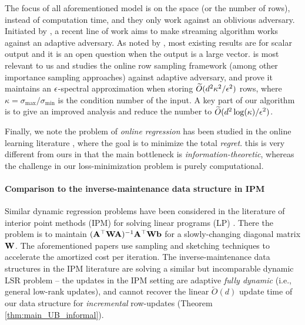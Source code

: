 The focus of all aforementioned model is on the space (or the number of rows), instead of computation time, and they only work against an oblivious adversary.
Initiated by \cite{bjwy22}, a recent line of work \cite{bjwy22, hkm+22,wz22} aims to make streaming algorithm works against an adaptive adversary. 
As noted by \cite{workshop2021}, most existing results are for scalar output and it is an open question when the output is a large vector.
\cite{bhm+21} is most relevant to us and studies the online row sampling framework \cite{cmp20} (among other importance sampling approaches) against adaptive adversary, and prove it maintains an $\epsilon$-spectral approximation when storing $\widetilde{O}(d^2\kappa^2/\epsilon^2)$ rows, where $\kappa = \sigma_{\max}/\sigma_{\min}$ is the condition number of the input. 
A key part of our algorithm is to give an improved analysis and reduce the number to $\widetilde{O}(d^2\log (\kappa)/\epsilon^2)$.

Finally, we note the problem of {\em online regression} has been studied in the online learning literature \cite{h19}, where the goal is to minimize the total {\em regret}. this is very different from ours in that the main bottleneck  is {\em information-theoretic}, whereas the challenge in our loss-minimization problem is purely computational.




\paragraph{Comparison to the inverse-maintenance data structure in IPM} Similar dynamic regression problems have been considered in the literature of interior point methods (IPM) for solving linear programs (LP) \cite{cls21,b20,lsz19,jswz21,ls14,blss20,bll+21}. There the problem is to maintain $(\mathbf{A}^\top \mathbf{W} \mathbf{A})^{-1} \mathbf{A}^\top \mathbf{W} \mathbf{b}$ for a slowly-changing diagonal matrix $\mathbf{W}$. The aforementioned papers use sampling and sketching techniques to accelerate the amortized cost per iteration. The inverse-maintenance data structures in the IPM literature are solving a similar but incomparable dynamic LSR problem -- the updates in the IPM setting are adaptive \emph{fully dynamic} (i.e., general low-rank updates), and cannot recover the linear $\tilde{O}(d)$ update time of 
our data structure for \emph{incremental} row-updates (Theorem \ref{thm:main_UB_informal}).  















